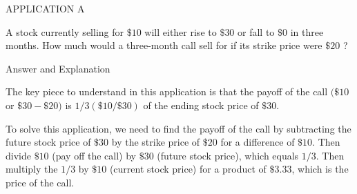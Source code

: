 \documentclass[11pt]{article}
\begin{document}
APPLICATION A

A stock currently selling for $\$ 10$ will either rise to $\$ 30$ or fall to $\$ 0$ in three months. How much would a three-month call sell for if its strike price were $\$ 20$ ?

Answer and Explanation

The key piece to understand in this application is that the payoff of the call $(\$ 10$ or $\$ 30-\$ 20)$ is $1 / 3(\$ 10 / \$ 30)$ of the ending stock price of $\$ 30$.

To solve this application, we need to find the payoff of the call by subtracting the future stock price of $\$ 30$ by the strike price of $\$ 20$ for a difference of $\$ 10$. Then divide $\$ 10$ (pay off the call) by $\$ 30$ (future stock price), which equals $1 / 3$. Then multiply the $1 / 3$ by $\$ 10$ (current stock price) for a product of $\$ 3.33$, which is the price of the call.
\end{document}

